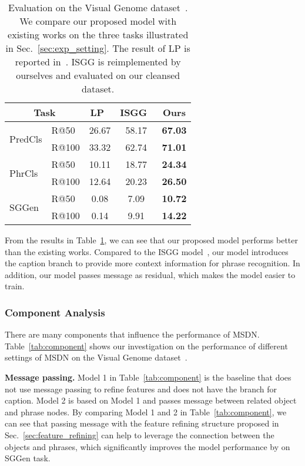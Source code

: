 \begin{table}[h]
	\small
\begin{center}
		\begin{tabular}{l  l ||  c c c  }
			\multicolumn{2}{c}{Task} & LP~\cite{visual_relationship}  & ISGG~\cite{xu2017scene}  & Ours  \\ \hline\hline
			\multirow{2}{*}{PredCls}     &R@50  & 26.67  & 58.17       &\textbf{67.03} \\
			&R@100  & 33.32 & 62.74        &  \textbf{71.01}      \\\hline
			\multirow{2}{*}{PhrCls}      &R@50& 10.11   & 18.77       &  \textbf{24.34}      \\
			&R@100 &  12.64  & 20.23      &  \textbf{26.50}\\\hline
			\multirow{2}{*}{SGGen}      &R@50& 0.08    & 7.09        &  \textbf{10.72}     \\
			&R@100 & 0.14    & 9.91      &  \textbf{14.22}      \\
			\hline
		\end{tabular}
\end{center}
	\caption{Evaluation on the Visual Genome
		dataset~\cite{visual_genome}. We compare our proposed model with existing works on the three tasks illustrated in Sec.~\ref{sec:exp_setting}. The result of LP is reported in~\cite{xu2017scene}. ISGG is reimplemented by ourselves and evaluated on our cleansed dataset. }
	\label{table:vg_eval}
\end{table}


From the results in Table~\ref{table:vg_eval}, we can see that our proposed model performs better than the existing works. Compared to the ISGG model~\cite{xu2017scene}, our model introduces the caption branch to provide more context information for phrase recognition. In addition, our model passes message as residual, which makes the model easier to train. 


\subsubsection{Component Analysis}

There are many components that influence the performance of MSDN. Table~\ref{tab:component} shows our investigation on the performance of different settings of MSDN on the Visual Genome dataset~\cite{visual_genome}.

\textbf{Message passing.} Model 1 in Table~\ref{tab:component} is the baseline that does not use message passing to refine features and does not have the branch for caption. Model 2 is based on Model 1 and passes message between related object and phrase nodes. By comparing Model 1 and 2 in Table~\ref{tab:component}, we can see that passing message with the feature refining structure  proposed in Sec.~\ref{sec:feature_refining} can help to leverage the connection between the objects and phrases, which significantly improves the model performance by  on SGGen task. 

